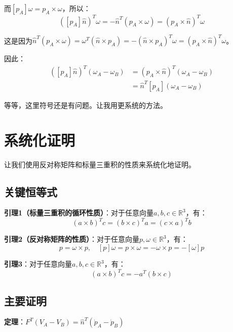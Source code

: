 \documentclass[12pt,a4paper]{article}
\begin{document}
而$[p_A] \omega = p_A \times \omega$，所以：
\begin{equation}
([p_A]\hat{n})^T \omega = -\hat{n}^T (p_A \times \omega) = (p_A \times \hat{n})^T \omega
\end{equation}

这是因为$\hat{n}^T (p_A \times \omega) = \omega^T (\hat{n} \times p_A) = -(\hat{n} \times p_A)^T \omega = (p_A \times \hat{n})^T \omega$。

因此：
\begin{align}
([p_A]\hat{n})^T (\omega_A - \omega_B) &= (p_A \times \hat{n})^T (\omega_A - \omega_B) \\
&= \hat{n}^T [p_A] (\omega_A - \omega_B)
\end{align}

等等，这里符号还是有问题。让我用更系统的方法。

\section{系统化证明}

让我们使用反对称矩阵和标量三重积的性质来系统化地证明。

\subsection{关键恒等式}

\textbf{引理1（标量三重积的循环性质）}：对于任意向量$a, b, c \in \mathbb{R}^3$，有：
\begin{equation}
(a \times b)^T c = (b \times c)^T a = (c \times a)^T b
\end{equation}

\textbf{引理2（反对称矩阵的性质）}：对于任意向量$p, \omega \in \mathbb{R}^3$，有：
\begin{equation}
[\omega] p = \omega \times p, \quad [p] \omega = p \times \omega = -\omega \times p = -[\omega] p
\end{equation}

\textbf{引理3}：对于任意向量$a, b, c \in \mathbb{R}^3$，有：
\begin{equation}
(a \times b)^T c = -a^T (b \times c)
\end{equation}

\subsection{主要证明}

\textbf{定理}：$F^T (V_A - V_B) = \hat{n}^T (\dot{p}_A - \dot{p}_B)$
\end{document}
